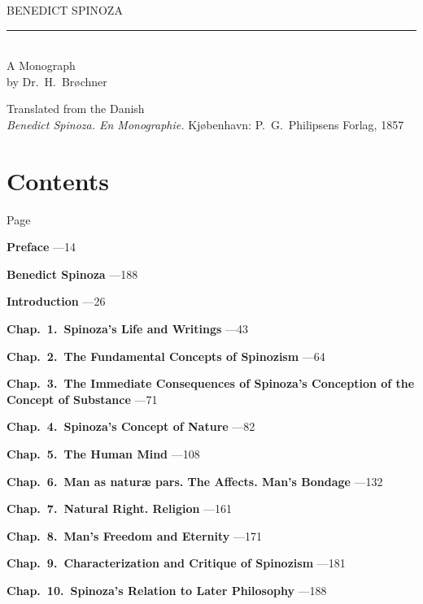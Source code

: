 \documentclass[12pt,a4paper,openany]{book}
\begin{document}
\begin{titlepage}\centering\vspace*{2cm}
{\Huge BENEDICT SPINOZA}\\[2ex]\rule{3em}{0.4pt}\\[2ex]{\Large A Monograph}\\[3ex]
{\large by Dr.\ H.\ Brøchner}\par\vfill
{\small Translated from the Danish}\\[0.6em]
{\small \textit{Benedict Spinoza. En Monographie.} Kjøbenhavn: P.\ G.\ Philipsens Forlag, 1857}
\end{titlepage}
\chapter*{Contents}

\begingroup
{}
\begin{list}{}{%
  \setlength{\leftmargin}{3.6em}\setlength{\itemindent}{-3.6em}%
  \setlength{\itemsep}{2pt}\setlength{\parsep}{0pt}}

\item[] \hfill Page

\item \textbf{Preface} ---14

\item[] \vspace{2pt}

\item \textbf{Benedict Spinoza} ---188
\item \textbf{Introduction} ---26
\item \textbf{Chap.\ 1.\ Spinoza's Life and Writings} ---43
\item \textbf{Chap.\ 2.\ The Fundamental Concepts of Spinozism} ---64
\item \textbf{Chap.\ 3.\ The Immediate Consequences of Spinoza's Conception of the
  Concept of Substance} ---71
\item \textbf{Chap.\ 4.\ Spinoza's Concept of Nature} ---82
\item \textbf{Chap.\ 5.\ The Human Mind} ---108
\item \textbf{Chap.\ 6.\ Man as naturæ pars. The Affects. Man's
  Bondage} ---132
\item \textbf{Chap.\ 7.\ Natural Right. Religion} ---161
\item \textbf{Chap.\ 8.\ Man's Freedom and Eternity} ---171
\item \textbf{Chap.\ 9.\ Characterization and Critique of Spinozism} ---181
\item \textbf{Chap.\ 10.\ Spinoza's Relation to Later Philosophy} ---188

\end{list}
\endgroup
\end{document}

